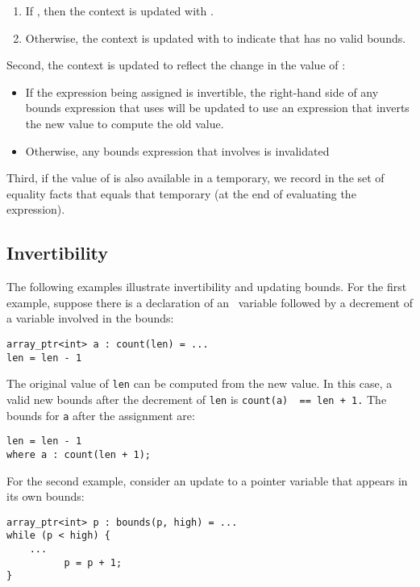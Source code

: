 \begin{enumerate}
\item
  If , then the context is updated with
  .
\item
  Otherwise, the context is updated with 
   to indicate that  has no valid bounds.
\end{enumerate}

Second, the context is updated to reflect the change in the value of
:

\begin{itemize}
\item
  If the expression being assigned is invertible, the right-hand side of
  any bounds expression that uses  will be updated to use an
  expression that inverts the new value to compute the old value.
\item
  Otherwise, any bounds expression that involves  is invalidated
\end{itemize}

Third, if the value of  is also available in a temporary,
we record in the set of equality facts that  equals that
temporary (at the end of evaluating the expression).

\subsection{Invertibility}

The following examples illustrate invertibility and updating bounds. For
the first example, suppose there is a declaration of an
\arrayptr\ variable followed by a decrement of a variable
involved in the bounds:

\begin{lstlisting}
array_ptr<int> a : count(len) = ...
len = len - 1
\end{lstlisting}

The original value of \lstinline|len| can be computed from the new value.
In this case, a valid new bounds after the decrement of \lstinline|len| is
\lstinline|count(a)  == len + 1.| The bounds for \lstinline|a| after the
assignment are:
\begin{lstlisting}
len = len - 1
where a : count(len + 1);
\end{lstlisting}

For the second example, consider an update to a pointer variable that
appears in its own bounds:
\begin{lstlisting}
array_ptr<int> p : bounds(p, high) = ...         
while (p < high) {
    ...
          p = p + 1;
}
\end{lstlisting}

